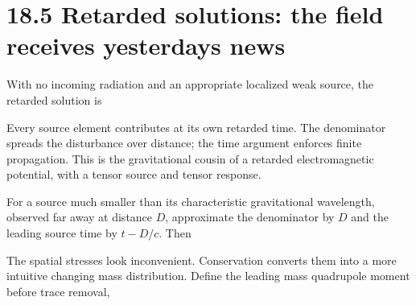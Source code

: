 \documentclass[
  11pt,
  letterpaper,
  oneside,
  openany]{scrbook}
\begin{document}
\hypertarget{retarded-solutions-the-field-receives-yesterdays-news}{%
\section{18.5 Retarded solutions: the field receives
yesterday\textquotesingle s
news}\label{retarded-solutions-the-field-receives-yesterdays-news}}

With no incoming radiation and an appropriate localized weak source, the
retarded solution is

\begin{center}
\begingroup
{}
\ifdim\wd\grmathbox>\linewidth
\resizebox{\linewidth}{!}{\usebox{\grmathbox}}
\else\usebox{\grmathbox}\fi
\endgroup
\end{center}

Every source element contributes at its own retarded time. The
denominator spreads the disturbance over distance; the time argument
enforces finite propagation. This is the gravitational cousin of a
retarded electromagnetic potential, with a tensor source and tensor
response.

For a source much smaller than its characteristic gravitational
wavelength, observed far away at distance \(D\), approximate the
denominator by \(D\) and the leading source time by \(t-D/c\). Then

\begin{center}
\begingroup
{}
\ifdim\wd\grmathbox>\linewidth
\resizebox{\linewidth}{!}{\usebox{\grmathbox}}
\else\usebox{\grmathbox}\fi
\endgroup
\end{center}

The spatial stresses look inconvenient. Conservation converts them into
a more intuitive changing mass distribution. Define the leading mass
quadrupole moment before trace removal,

\begin{center}
\begingroup
{}
\ifdim\wd\grmathbox>\linewidth
\resizebox{\linewidth}{!}{\usebox{\grmathbox}}
\else\usebox{\grmathbox}\fi
\endgroup
\end{center}
\end{document}
